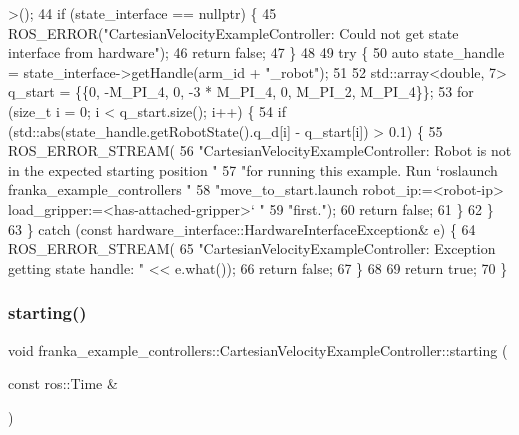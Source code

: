 \begin{DoxyCode}
      >();
44   \textcolor{keywordflow}{if} (state\_interface == \textcolor{keyword}{nullptr}) \{
45     ROS\_ERROR(\textcolor{stringliteral}{"CartesianVelocityExampleController: Could not get state interface from hardware"});
46     \textcolor{keywordflow}{return} \textcolor{keyword}{false};
47   \}
48 
49   \textcolor{keywordflow}{try} \{
50     \textcolor{keyword}{auto} state\_handle = state\_interface->getHandle(arm\_id + \textcolor{stringliteral}{"\_robot"});
51 
52     std::array<double, 7> q\_start = \{\{0, -M\_PI\_4, 0, -3 * M\_PI\_4, 0, M\_PI\_2, M\_PI\_4\}\};
53     \textcolor{keywordflow}{for} (\textcolor{keywordtype}{size\_t} i = 0; i < q\_start.size(); i++) \{
54       \textcolor{keywordflow}{if} (std::abs(state\_handle.getRobotState().q\_d[i] - q\_start[i]) > 0.1) \{
55         ROS\_ERROR\_STREAM(
56             \textcolor{stringliteral}{"CartesianVelocityExampleController: Robot is not in the expected starting position "}
57             \textcolor{stringliteral}{"for running this example. Run `roslaunch franka\_example\_controllers "}
58             \textcolor{stringliteral}{"move\_to\_start.launch robot\_ip:=<robot-ip> load\_gripper:=<has-attached-gripper>` "}
59             \textcolor{stringliteral}{"first."});
60         \textcolor{keywordflow}{return} \textcolor{keyword}{false};
61       \}
62     \}
63   \} \textcolor{keywordflow}{catch} (\textcolor{keyword}{const} hardware\_interface::HardwareInterfaceException& e) \{
64     ROS\_ERROR\_STREAM(
65         \textcolor{stringliteral}{"CartesianVelocityExampleController: Exception getting state handle: "} << e.what());
66     \textcolor{keywordflow}{return} \textcolor{keyword}{false};
67   \}
68 
69   \textcolor{keywordflow}{return} \textcolor{keyword}{true};
70 \}
\end{DoxyCode}
\mbox{\label{classfranka__example__controllers_1_1CartesianVelocityExampleController_a9326c6506dc721e03447fef88c5c59f7}} 
\subsubsection{\texorpdfstring{starting()}{starting()}}
{\footnotesize\ttfamily void franka\+\_\+example\+\_\+controllers\+::\+Cartesian\+Velocity\+Example\+Controller\+::starting (\begin{DoxyParamCaption}\item[{const ros\+::\+Time \&}]{ }\end{DoxyParamCaption})\hspace{0.3cm}{\ttfamily [override]}}



